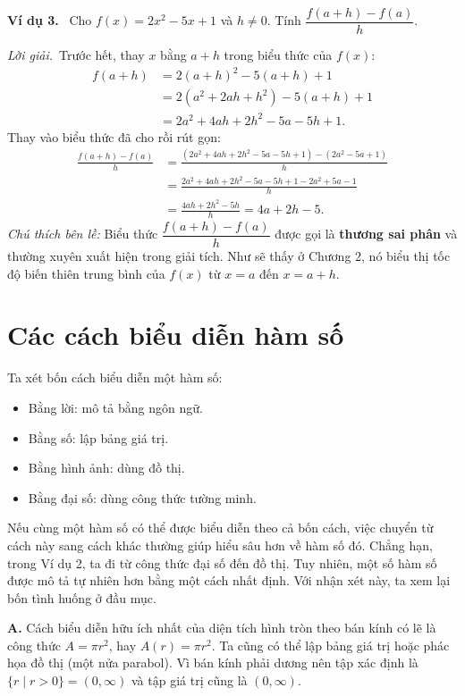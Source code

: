 \documentclass[12pt,a4paper]{article}
\newcommand{\ex}[1]{\par\medskip\noindent\textbf{Ví dụ #1.}\ }
\newcommand{\sol}{\par\noindent\textit{Lời giải.}\ }
\begin{document}
\ex{3} Cho $f(x)=2x^2-5x+1$ và $h\ne0$. Tính $\dfrac{f(a+h)-f(a)}h$.
\sol Trước hết, thay $x$ bằng $a+h$ trong biểu thức của $f(x)$:
\begin{align*}
f(a+h)&=2(a+h)^2-5(a+h)+1\\
&=2(a^2+2ah+h^2)-5(a+h)+1\\
&=2a^2+4ah+2h^2-5a-5h+1.
\end{align*}
Thay vào biểu thức đã cho rồi rút gọn:
\begin{align*}
\frac{f(a+h)-f(a)}h
&=\frac{(2a^2+4ah+2h^2-5a-5h+1)-(2a^2-5a+1)}h\\
&=\frac{2a^2+4ah+2h^2-5a-5h+1-2a^2+5a-1}h\\
&=\frac{4ah+2h^2-5h}h=4a+2h-5.
\end{align*}
\noindent\textit{Chú thích bên lề:} Biểu thức $\dfrac{f(a+h)-f(a)}h$ được gọi là \textbf{thương sai phân} và thường xuyên xuất hiện trong giải tích. Như sẽ thấy ở Chương 2, nó biểu thị tốc độ biến thiên trung bình của $f(x)$ từ $x=a$ đến $x=a+h$.

\section*{Các cách biểu diễn hàm số}
Ta xét bốn cách biểu diễn một hàm số:
\begin{itemize}[nosep]
\item Bằng lời: mô tả bằng ngôn ngữ.
\item Bằng số: lập bảng giá trị.
\item Bằng hình ảnh: dùng đồ thị.
\item Bằng đại số: dùng công thức tường minh.
\end{itemize}
Nếu cùng một hàm số có thể được biểu diễn theo cả bốn cách, việc chuyển từ cách này sang cách khác thường giúp hiểu sâu hơn về hàm số đó. Chẳng hạn, trong Ví dụ 2, ta đi từ công thức đại số đến đồ thị. Tuy nhiên, một số hàm số được mô tả tự nhiên hơn bằng một cách nhất định. Với nhận xét này, ta xem lại bốn tình huống ở đầu mục.

\noindent\textbf{A.} Cách biểu diễn hữu ích nhất của diện tích hình tròn theo bán kính có lẽ là công thức $A=\pi r^2$, hay $A(r)=\pi r^2$. Ta cũng có thể lập bảng giá trị hoặc phác họa đồ thị (một nửa parabol). Vì bán kính phải dương nên tập xác định là $\{r\mid r>0\}=(0,\infty)$ và tập giá trị cũng là $(0,\infty)$.
\end{document}

